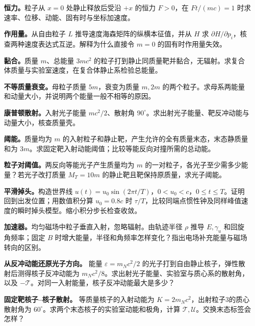 \begin{bookexercises}
\item {} \textbf{恒力。}粒子从 $x=0$ 处静止释放后受沿 $+x$ 的恒力 $F>0$，在 $Ft/(mc)=1$ 时求速率、位移、动能、固有时与坐标加速度。
\item {} \textbf{作用量。}从自由粒子 $L$ 推导速度海森矩阵的纵横本征值，并从 $H$ 求 $\partial H/\partial p_i$，核查两种速度表达式互逆。解释为什么直接令 $m=0$ 的固有时作用量失效。
\item {} \textbf{黏合。}质量 $m$、总能量 $3mc^2$ 的粒子打到静止同质量靶并黏合，无辐射。求复合体质量与实验室速度，在复合体静止系检验总能量。
\item {} \textbf{不等质量衰变。}母粒子质量 $5m$，衰变为质量 $m,2m$ 的两个粒子。求母系两能量和动量大小，并说明两个能量一般不相等的原因。
\item {} \textbf{康普顿散射。}入射光子能量 $mc^2/2$、散射角 $90^\circ$。求出射光子能量、靶反冲动能与动量大小，核查质量壳。
\item {} \textbf{阈能。}质量均为 $m$ 的入射粒子和静止靶，产生允许的全有质量末态，末态静质量和为 $3m$。求固定靶入射动能阈值；比较等能反向对撞所需的总动能。
\item {} \textbf{粒子对阈值。}两反向等能光子产生质量均为 $m$ 的一对粒子，各光子至少需多少能量？若光子改打质量 $M_T=10m$ 的静止靶且靶保持原质量，求光子阈能。
\item {} \textbf{平滑掉头。}构造世界线 $u(t)=u_0\sin(2\pi t/T)$，$0<u_0<c$，$0\le t\le T$。证明回到出发位置；用数值积分算 $u_0=0.8c$ 时 $\tau/T$，比较同端点惯性钟及同样峰值速度的瞬时掉头模型。缩小积分步长检查收敛。
\item {} \textbf{加速器。}均匀磁场中粒子垂直入射，忽略辐射。由轨迹半径 $\rho$ 推导 $E,\gamma_u$ 和回旋角频率；固定 $B$ 时增大能量，半径和角频率怎样变化？指出电场补充能量与磁场转向的区别。
\item {} \textbf{从反冲动能还原光子方向。} 能量 $\varepsilon=m_Nc^2/2$ 的光子打到自由静止核子，弹性散射后测得核子反冲动能为 $m_Nc^2/8$。求出射光子能量、实验室与质心系的散射角，以及 $-\mathcal T$。对同一入射能量，核子反冲动能最大是多少？
\item {} \textbf{固定靶核子--核子散射。} 等质量核子的入射动能为 $K=2m_Nc^2$，出射粒子3的质心散射角为 $60^\circ$。求两个末态核子的实验室动能和极角，计算 $\mathcal T,\mathcal U$。交换末态标签会怎样？
\end{bookexercises}

